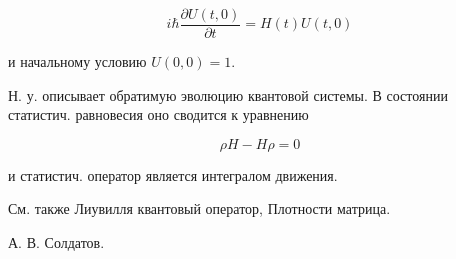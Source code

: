 \documentclass[10pt]{article}
\begin{document}
\[

i \hbar \frac{\partial U(t, 0)}{\partial t}=H(t) U(t, 0)

\]



и начальному условию $U(0,0)=1$.



Н. у. описывает обратимую эволюцию квантовой системы. В состоянии статистич. равновесия оно сводится к уравнению



\[

\rho H-H \rho=0

\]



и статистич. оператор является интегралом движения.



См. также Лиувилля квантовый оператор, Плотности матрица.



А. В. Солдатов.
\end{document}
